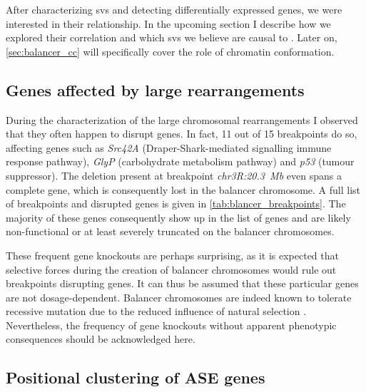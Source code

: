 After characterizing \acp{sv} and detecting differentially expressed genes, we
were interested in their relationship. In the upcoming section I describe how we
explored their correlation and which \acp{sv} we believe are causal to \ase.
Later on, \cref{sec:balancer_cc} will specifically cover the role of
chromatin conformation.



\subsection{Genes affected by large rearrangements}
\label{sec:balancer_ase_breakpoints}

During the characterization of the large chromosomal rearrangements
I observed that they often happen to disrupt genes. In fact, 11 out
of 15 breakpoints do so, affecting genes such as \textit{Src42A}
(Draper-Shark-mediated signalling immune response pathway), \textit{GlyP}
(carbohydrate metabolism pathway) and \textit{p53} (tumour suppressor). The
deletion present at breakpoint \textit{chr3R:20.3~Mb} even spans a complete
gene, which is consequently lost in the balancer chromosome. A full list of
breakpoints and disrupted genes is given in  \cref{tab:blancer_breakpoints}.
The majority of these genes consequently show up in the list of \ase genes
and are likely non-functional or at least severely truncated on the balancer
chromosomes.

These frequent gene knockouts are perhaps surprising, as it is expected that
selective forces during the creation of balancer chromosomes would rule out
breakpoints disrupting genes. It can thus be assumed that these
particular genes are not dosage-dependent. Balancer chromosomes are indeed known
to tolerate recessive mutation due to the reduced influence of
natural selection \citep{Araye2013}. Nevertheless, the frequency of gene knockouts
without apparent phenotypic consequences should be acknowledged here.





\subsection{Positional clustering of ASE genes}
\label{sec:balancer_ase_clustering}


